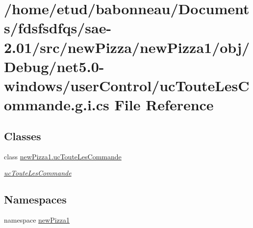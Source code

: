 \hypertarget{net5_80-windows_2userControl_2ucTouteLesCommande_8g_8i_8cs}{}\section{/home/etud/babonneau/\+Documents/fdsfsdfqs/sae-\/2.01/src/new\+Pizza/new\+Pizza1/obj/\+Debug/net5.0-\/windows/user\+Control/uc\+Toute\+Les\+Commande.g.\+i.\+cs File Reference}
\label{net5_80-windows_2userControl_2ucTouteLesCommande_8g_8i_8cs}
\subsection*{Classes}
\begin{DoxyCompactItemize}
\item 
class \hyperlink{classnewPizza1_1_1ucTouteLesCommande}{new\+Pizza1.\+uc\+Toute\+Les\+Commande}
\begin{DoxyCompactList}\small\item\em \hyperlink{classnewPizza1_1_1ucTouteLesCommande}{uc\+Toute\+Les\+Commande} \end{DoxyCompactList}\end{DoxyCompactItemize}
\subsection*{Namespaces}
\begin{DoxyCompactItemize}
\item 
namespace \hyperlink{namespacenewPizza1}{new\+Pizza1}
\end{DoxyCompactItemize}
